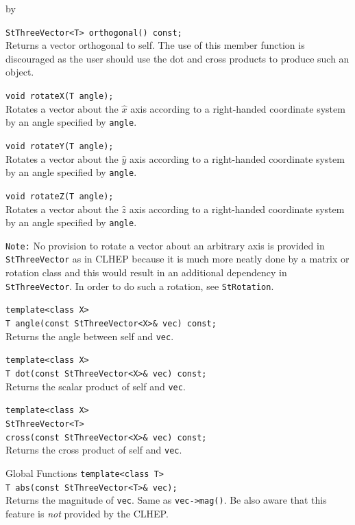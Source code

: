 \documentclass[twoside]{article}
\newcommand{\comp}[1]{\texttt{#1}}%
\newcommand{\entrylabel}[1]{\mbox{\textbf{{#1}}}\hfil}%
\newenvironment{entry}
{\begin{list}{}%
    {\renewcommand{\makelabel}{\entrylabel}%
     \setlength{\labelwidth}{90pt}%
     \setlength{\leftmargin}{\labelwidth}
     \advance\leftmargin by \labelsep%
      }%
    }%
  {\end{list}}
\newcommand{\Entrylabel}[1]%
{\raisebox{0pt}[1ex][0pt]{\makebox[\labelwidth][l]%
    {\parbox[t]{\labelwidth}{\hspace{0pt}\textbf{{#1}}}}}}
\newenvironment{Entry}%
{\renewcommand{\entrylabel}{\Entrylabel}\begin{entry}}%
  {\end{entry}}
\begin{document}
\begin{description}
\begin{Entry}
    \verb+StThreeVector<T> orthogonal() const;+\\
    Returns a vector orthogonal to self.  The use of this
    member function is discouraged as the user should
    use the dot and cross products to produce such an
    object.

    \verb+void rotateX(T angle);+\\
    Rotates a vector about the $\hat{x}$ axis according to a right-handed
    coordinate system by an angle specified by \texttt{angle}.

    \verb+void rotateY(T angle);+\\
    Rotates a vector about the $\hat{y}$ axis according to a right-handed
    coordinate system by an angle specified by \texttt{angle}.

    \verb+void rotateZ(T angle);+\\
    Rotates a vector about the $\hat{z}$ axis according to a right-handed
    coordinate system by an angle specified by \texttt{angle}.

    \comp{Note:} No provision to rotate a vector about an arbitrary axis
    is provided in \comp{StThreeVector} as in CLHEP because it is much
    more neatly done by a matrix or rotation class and this would result
    in an additional dependency in \comp{StThreeVector}.  In order
    to do such a rotation, see \comp{StRotation}.\label{StRotation}
    
    \verb+template<class X>+\\
    \verb+T angle(const StThreeVector<X>& vec) const;+\\
    Returns the angle between self and \comp{vec}.
    
    \verb+template<class X>+\\
    \verb+T dot(const StThreeVector<X>& vec) const;+\\
    Returns the scalar product of self and \comp{vec}.
    
    \verb+template<class X>+\\
    \verb+StThreeVector<T>+\\
    \verb+cross(const StThreeVector<X>& vec) const;+\\
    Returns the cross product of self and \comp{vec}.
    
\item[Global Functions]
    \verb+template<class T>+\\
    \verb+T abs(const StThreeVector<T>& vec);+\\ 
    Returns the magnitude of \comp{vec}. Same as
    \verb+vec->mag()+.
    Be also aware that this feature is {\em not} provided by
    the CLHEP.
    

\end{Entry}
\end{description}
\end{document}
